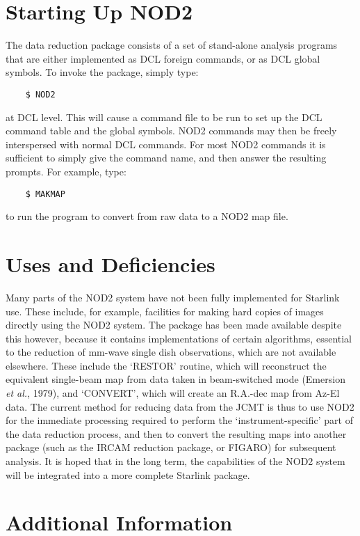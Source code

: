\section {Starting Up NOD2}

The data reduction package consists of a set of stand-alone
analysis programs that are either implemented as DCL foreign
commands, or as DCL global symbols. To invoke the package, simply
type:
\begin{verbatim}
    $ NOD2
\end{verbatim}
at DCL level. This will cause a command file to be run to set up the 
DCL command table and the global symbols. NOD2 commands may then
be freely interspersed with normal DCL commands. For most NOD2 commands
it is sufficient to simply give the command name, and then answer the
resulting prompts. For example, type:
\begin{verbatim}
    $ MAKMAP
\end{verbatim}
to run the program to convert from raw data to a NOD2 map file.

\section {Uses and Deficiencies}

Many parts of the NOD2 system have not been fully implemented for Starlink
use. These include, for example, facilities for making hard copies of
images directly using the NOD2 system. The package has been made available
despite this however, because it contains implementations of certain
algorithms, essential to the reduction of mm-wave single dish observations,
which are not available elsewhere. These include the `RESTOR' routine,
which will reconstruct the equivalent single-beam map from data taken
in beam-switched mode (Emersion {\it et al.}, 1979), and 
`CONVERT', which will create an R.A.-dec
map from Az-El data. The current method for reducing data from the JCMT
is thus to use NOD2 for the immediate processing required to
perform the `instrument-specific' part of the data reduction process, 
and then to convert the resulting maps into another package (such as the
IRCAM reduction package, or FIGARO) for subsequent analysis. It is
hoped that in the long term, the capabilities of the NOD2 system will
be integrated into a more complete Starlink package.

\section {Additional Information}

